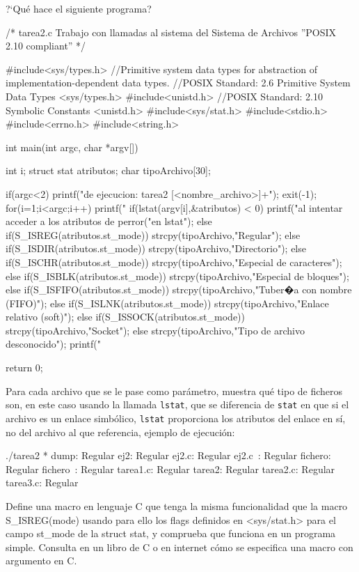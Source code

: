 \begin{exercise}
?`Qué hace el siguiente programa?

\begin{cppcode}
/*
tarea2.c
Trabajo con llamadas al sistema del Sistema de Archivos ''POSIX 2.10 compliant''
*/

#include<sys/types.h>    //Primitive system data types for abstraction of implementation-dependent data types.
                        //POSIX Standard: 2.6 Primitive System Data Types <sys/types.h>
#include<unistd.h>        //POSIX Standard: 2.10 Symbolic Constants         <unistd.h>
#include<sys/stat.h>
#include<stdio.h>
#include<errno.h>
#include<string.h>

int main(int argc, char *argv[])
{
int i;
struct stat atributos;
char tipoArchivo[30];

if(argc<2) {
    printf("\nSintaxis de ejecucion: tarea2 [<nombre_archivo>]+\n\n");
    exit(-1);
}
for(i=1;i<argc;i++) {
    printf("%
    if(lstat(argv[i],&atributos) < 0) {
        printf("\nError al intentar acceder a los atributos de %
        perror("\nError en lstat");
    }
    else {
        if(S_ISREG(atributos.st_mode)) strcpy(tipoArchivo,"Regular");
        else if(S_ISDIR(atributos.st_mode)) strcpy(tipoArchivo,"Directorio");
        else if(S_ISCHR(atributos.st_mode)) strcpy(tipoArchivo,"Especial de caracteres");
        else if(S_ISBLK(atributos.st_mode)) strcpy(tipoArchivo,"Especial de bloques");
        else if(S_ISFIFO(atributos.st_mode)) strcpy(tipoArchivo,"Tuber�a con nombre (FIFO)");
        else if(S_ISLNK(atributos.st_mode)) strcpy(tipoArchivo,"Enlace relativo (soft)");
        else if(S_ISSOCK(atributos.st_mode)) strcpy(tipoArchivo,"Socket");
        else strcpy(tipoArchivo,"Tipo de archivo desconocido");
        printf("%
    }
}

return 0;
}
\end{cppcode}

{\color{blue} 
Para cada archivo que se le pase como parámetro, muestra qué tipo de ficheros son, en este caso usando la llamada \verb/lstat/, que se diferencia de \verb/stat/ en que si el archivo es un enlace simbólico, \verb/lstat/ proporciona los atributos del enlace en sí, no del archivo al que referencia, ejemplo de ejecución:

\begin{bashcode}
./tarea2 *
dump: Regular
ej2: Regular
ej2.c: Regular
ej2.c~: Regular
fichero: Regular
fichero~: Regular
tarea1.c: Regular
tarea2: Regular
tarea2.c: Regular
tarea3.c: Regular
\end{bashcode}
}
\end{exercise}

\begin{exercise}
Define una macro en lenguaje C que tenga la misma funcionalidad que la macro
S_ISREG(mode) usando para ello los flags definidos en <sys/stat.h> para el campo st_mode
de la struct stat, y comprueba que funciona en un programa simple. Consulta en un libro
de C o en internet cómo se especifica una macro con argumento en C.

\end{exercise}